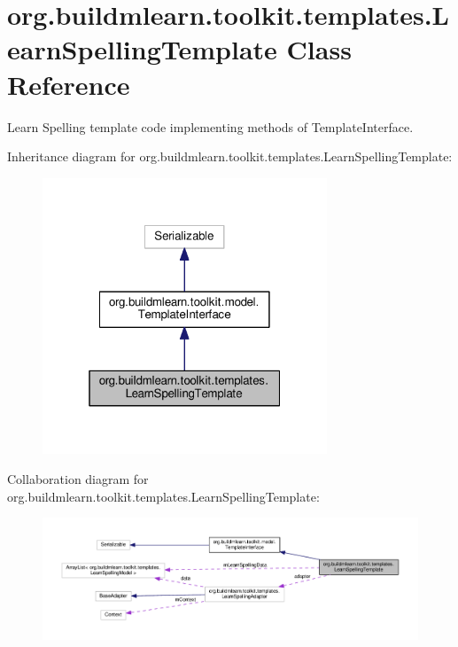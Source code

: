 \hypertarget{classorg_1_1buildmlearn_1_1toolkit_1_1templates_1_1LearnSpellingTemplate}{}\section{org.\+buildmlearn.\+toolkit.\+templates.\+Learn\+Spelling\+Template Class Reference}
\label{classorg_1_1buildmlearn_1_1toolkit_1_1templates_1_1LearnSpellingTemplate}


Learn Spelling template code implementing methods of Template\+Interface.  




Inheritance diagram for org.\+buildmlearn.\+toolkit.\+templates.\+Learn\+Spelling\+Template\+:
\nopagebreak
\begin{figure}[H]
\begin{center}
\leavevmode
\includegraphics[width=241pt]{classorg_1_1buildmlearn_1_1toolkit_1_1templates_1_1LearnSpellingTemplate__inherit__graph}
\end{center}
\end{figure}


Collaboration diagram for org.\+buildmlearn.\+toolkit.\+templates.\+Learn\+Spelling\+Template\+:
\nopagebreak
\begin{figure}[H]
\begin{center}
\leavevmode
\includegraphics[width=350pt]{classorg_1_1buildmlearn_1_1toolkit_1_1templates_1_1LearnSpellingTemplate__coll__graph}
\end{center}
\end{figure}
